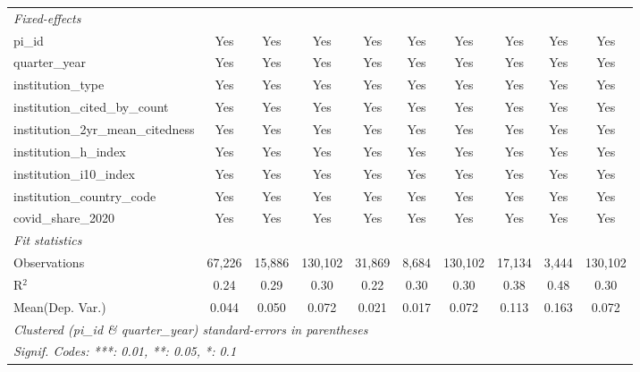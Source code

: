 \begin{tabular}{lccccccccc}
   \midrule
   \emph{Fixed-effects}\\
   pi\_id                                                      & Yes            & Yes            & Yes            & Yes           & Yes            & Yes            & Yes           & Yes          & Yes\\  
   quarter\_year                                               & Yes            & Yes            & Yes            & Yes           & Yes            & Yes            & Yes           & Yes          & Yes\\  
   institution\_type                                           & Yes            & Yes            & Yes            & Yes           & Yes            & Yes            & Yes           & Yes          & Yes\\  
   institution\_cited\_by\_count                               & Yes            & Yes            & Yes            & Yes           & Yes            & Yes            & Yes           & Yes          & Yes\\  
   institution\_2yr\_mean\_citedness                           & Yes            & Yes            & Yes            & Yes           & Yes            & Yes            & Yes           & Yes          & Yes\\  
   institution\_h\_index                                       & Yes            & Yes            & Yes            & Yes           & Yes            & Yes            & Yes           & Yes          & Yes\\  
   institution\_i10\_index                                     & Yes            & Yes            & Yes            & Yes           & Yes            & Yes            & Yes           & Yes          & Yes\\  
   institution\_country\_code                                  & Yes            & Yes            & Yes            & Yes           & Yes            & Yes            & Yes           & Yes          & Yes\\  
   covid\_share\_2020                                          & Yes            & Yes            & Yes            & Yes           & Yes            & Yes            & Yes           & Yes          & Yes\\  
   \midrule
   \emph{Fit statistics}\\
   Observations                                                & 67,226         & 15,886         & 130,102        & 31,869        & 8,684          & 130,102        & 17,134        & 3,444        & 130,102\\  
   R$^2$                                                       & 0.24           & 0.29           & 0.30           & 0.22          & 0.30           & 0.30           & 0.38          & 0.48         & 0.30\\  
Mean(Dep. Var.) & 0.044 & 0.050 & 0.072 & 0.021 & 0.017 & 0.072 & 0.113 & 0.163 & 0.072 \\
   \midrule \midrule
   \multicolumn{10}{l}{\emph{Clustered (pi\_id \& quarter\_year) standard-errors in parentheses}}\\
   \multicolumn{10}{l}{\emph{Signif. Codes: ***: 0.01, **: 0.05, *: 0.1}}\\
\end{tabular}
\par\endgroup
